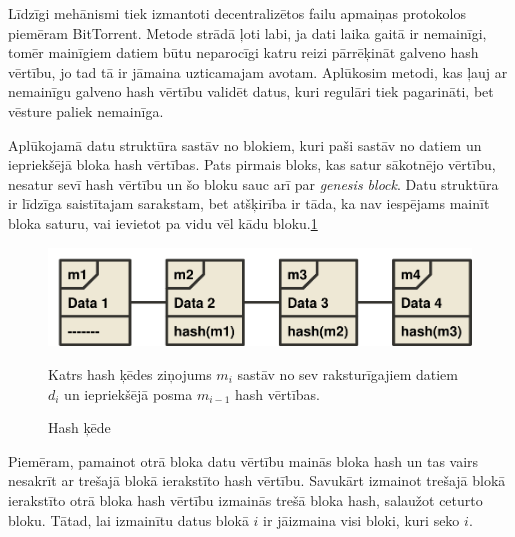 Līdzīgi mehānismi tiek izmantoti decentralizētos failu apmaiņas protokolos piemēram BitTorrent. Metode strādā ļoti labi, ja dati laika gaitā ir nemainīgi, tomēr mainīgiem datiem būtu neparocīgi katru reizi pārrēķināt galveno hash vērtību, jo tad tā ir jāmaina uzticamajam avotam. Aplūkosim metodi, kas ļauj ar nemainīgu galveno hash vērtību validēt datus, kuri regulāri tiek pagarināti, bet vēsture paliek nemainīga.

Aplūkojamā datu struktūra sastāv no blokiem, kuri paši sastāv no datiem un iepriekšējā bloka hash vērtības. Pats pirmais bloks, kas satur sākotnējo vērtību, nesatur sevī hash vērtību un šo bloku sauc arī par \textit{genesis block}. Datu struktūra ir līdzīga saistītajam sarakstam, bet atšķirība ir tāda, ka nav iespējams mainīt bloka saturu, vai ievietot pa vidu vēl kādu bloku.\ref{fig:hash-chain}

\begin{figure}[htpb]
    \centering
    \includegraphics[scale=0.5]{teorija/hash-chain.pdf}
    \caption{Hash ķēde}
    Katrs hash ķēdes ziņojums $m_i$ sastāv no sev raksturīgajiem datiem $d_i$ un
    iepriekšējā posma $m_{i-1}$ hash vērtības.
\label{fig:hash-chain}
\end{figure}

Piemēram, pamainot otrā bloka datu vērtību mainās bloka hash un tas vairs nesakrīt ar trešajā blokā ierakstīto hash vērtību. Savukārt izmainot trešajā blokā ierakstīto otrā bloka hash vērtību izmainās trešā bloka hash, salaužot ceturto bloku. Tātad, lai izmainītu datus blokā $i$ ir jāizmaina visi bloki, kuri seko $i$.

